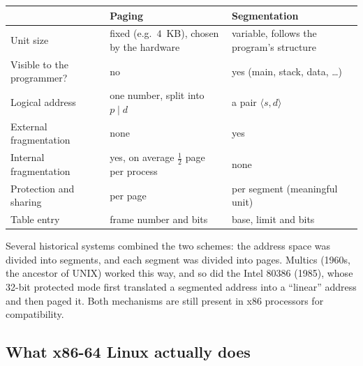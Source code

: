 \documentclass[11pt,a4paper]{article}
\begin{document}
\begin{center}
\renewcommand{\arraystretch}{1.3}
\begin{tabularx}{\linewidth}{>{\raggedright\arraybackslash}p{3.6cm} >{\raggedright\arraybackslash}X >{\raggedright\arraybackslash}X}
\toprule
 & \textbf{Paging} & \textbf{Segmentation} \\
\midrule
Unit size & fixed (e.g.\ $4$~KB), chosen by the hardware & variable, follows the program's structure \\
Visible to the programmer? & no & yes (main, stack, data, \dots) \\
Logical address & one number, split into $p \mid d$ & a pair $\langle s, d\rangle$ \\
External fragmentation & none & yes \\
Internal fragmentation & yes, on average $\tfrac12$ page per process & none \\
Protection and sharing & per page & per segment (meaningful unit) \\
Table entry & frame number and bits & base, limit and bits \\
\bottomrule
\end{tabularx}
\end{center}

\begin{histnote}
Several historical systems combined the two schemes: the address space was divided into segments, and each segment was divided into pages. Multics (1960s, the ancestor of UNIX) worked this way, and so did the Intel 80386 (1985), whose 32-bit protected mode first translated a segmented address into a ``linear'' address and then paged it. Both mechanisms are still present in x86 processors for compatibility.
\end{histnote}

\subsection{What x86-64 Linux actually does}
\label{sec:x86}
\end{document}
